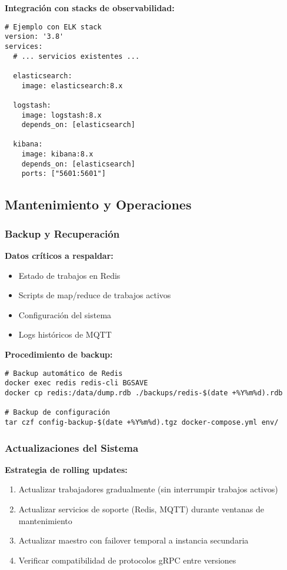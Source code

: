 \textbf{Integración con stacks de observabilidad:}
\begin{verbatim}
# Ejemplo con ELK stack
version: '3.8'
services:
  # ... servicios existentes ...
  
  elasticsearch:
    image: elasticsearch:8.x
  
  logstash:
    image: logstash:8.x
    depends_on: [elasticsearch]
  
  kibana:
    image: kibana:8.x
    depends_on: [elasticsearch]
    ports: ["5601:5601"]
\end{verbatim}

\subsection{Mantenimiento y Operaciones}

\subsubsection{Backup y Recuperación}

\textbf{Datos críticos a respaldar:}
\begin{itemize}
    \item Estado de trabajos en Redis
    \item Scripts de map/reduce de trabajos activos
    \item Configuración del sistema
    \item Logs históricos de MQTT
\end{itemize}

\textbf{Procedimiento de backup:}
\begin{verbatim}
# Backup automático de Redis
docker exec redis redis-cli BGSAVE
docker cp redis:/data/dump.rdb ./backups/redis-$(date +%Y%m%d).rdb

# Backup de configuración
tar czf config-backup-$(date +%Y%m%d).tgz docker-compose.yml env/
\end{verbatim}

\subsubsection{Actualizaciones del Sistema}

\textbf{Estrategia de rolling updates:}
\begin{enumerate}
    \item Actualizar trabajadores gradualmente (sin interrumpir trabajos activos)
    \item Actualizar servicios de soporte (Redis, MQTT) durante ventanas de mantenimiento
    \item Actualizar maestro con failover temporal a instancia secundaria
    \item Verificar compatibilidad de protocolos gRPC entre versiones
\end{enumerate}

